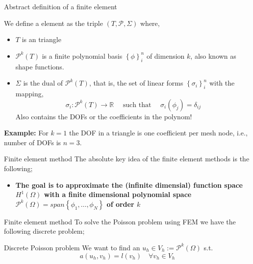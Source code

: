 \begin{frame}{Abstract definition of a finite element}
    \begin{block}{}
    We define a element as the triple $(T, \mathcal{P}, \Sigma )$ where,
    \begin{itemize}
        \item $T$ is an triangle
        \item $\mathcal{P}^{k}( T)   $ is a finite polynomial basis $\left\{ \phi  \right\}_{i}^{n} $  of dimension $k$, also known as shape functions.
        \item $\Sigma $ is the dual of $\mathcal{P}^{k}( T)  $, that is, the set of linear forms $\left\{ \sigma _{i} \right\}_{i}^{n} $ with the mapping,
            \[
            \sigma _{i}:  \mathcal{P}^{k}( T) \to \mathbb{R} \quad  \text{ such that  } \quad   \sigma _{i}( \phi _{j})  = \delta _{ij}
            \]
            Also contains the DOFs or the coefficients in the polynom!
    \end{itemize}
    \end{block}

    \textbf{Example:} For $k=1$ the DOF in a triangle is one coefficient per mesh node, i.e., number of DOFs is $n = 3$.


\end{frame}

\begin{frame}{Finite element method}
    The absolute key idea of the finite element methods is the following; \\
    \begin{itemize}
        \item \textbf{ The goal is to approximate the (infinite dimensial) function space $H^{1}( \Omega ) $ with a finite dimensional polynomial space $\mathcal{P}^{k}( \Omega ) = span  \left\{ \phi_{1}, \ldots, \phi _{N}  \right\} $ of order $k$  }
    \end{itemize}

\end{frame}

\begin{frame}{Finite element method}
    To solve the Poisson problem using FEM we have the following discrete problem;

    \begin{block}{ Discrete Poisson problem }
    We want to find an $u_{h} \in V_{h} := \mathcal{P}^{k}( \Omega )  $ s.t. \[
    a( u_{h}, v_{h}) = l ( v_{h}) \quad  \forall v_{h} \in V_{h}
    \]
    \end{block}

\end{frame}

